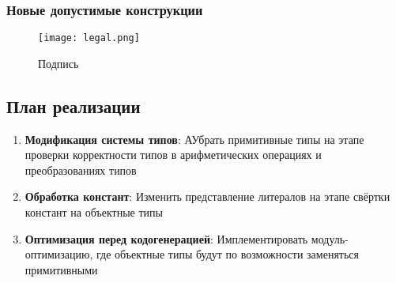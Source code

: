 \subsubsection{Новые допустимые конструкции}
\begin{figure}[H] %
    \centering
    \texttt{[image: legal.png]}
    \caption{Подпись}
    \label{fig:example}
\end{figure}


\subsection{План реализации}
\begin{enumerate}
    \item \textbf{Модификация системы типов}: АУбрать примитивные типы на этапе проверки корректности типов в арифметических операциях и преобразованиях типов
    \item \textbf{Обработка констант}: Изменить представление литералов на этапе свёртки констант на объектные типы
    \item \textbf{Оптимизация перед кодогенерацией}: Имплементировать модуль-оптимизацию, где объектные типы будут по возможности заменяться примитивными
\end{enumerate}

\newpage
